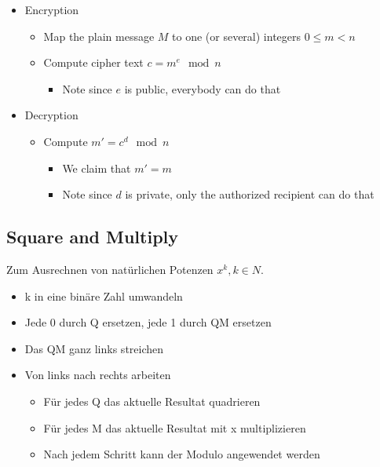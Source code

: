 \begin{itemize}
\tightlist
\item
  Encryption

  \begin{itemize}
  \tightlist
  \item
    Map the plain message $M$ to one (or several) integers $0 \leqslant m < n$
  \item Compute cipher text $c = m^e \mod n$
    \begin{itemize}
    \tightlist
    \item
      Note since $e$ is public, everybody can do that
    \end{itemize}
  \end{itemize}
\item
  Decryption
  \begin{itemize}
  \tightlist
  \item
    Compute $m' = c^d \mod n$
    \begin{itemize}
    \tightlist
    \item
      We claim that $m' = m$
    \item
      Note since $d$ is private, only the authorized recipient can do that
    \end{itemize}
  \end{itemize}
\end{itemize}

\hypertarget{square-and-multiply}{%
\subsection{Square and Multiply}\label{square-and-multiply}}

Zum Ausrechnen von natürlichen Potenzen $x^k, k \in N$.
\begin{itemize}
    \item k in eine binäre Zahl umwandeln
    \item Jede 0 durch Q ersetzen, jede 1 durch QM ersetzen
    \item Das QM ganz links streichen
    \item Von links nach rechts arbeiten
    \begin{itemize}
        \item Für jedes Q das aktuelle Resultat quadrieren
        \item Für jedes M das aktuelle Resultat mit x multiplizieren
        \item Nach jedem Schritt kann der Modulo angewendet werden
    \end{itemize}
\end{itemize}

